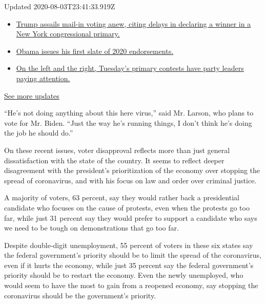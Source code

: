 Updated 2020-08-03T23:41:33.919Z

\begin{itemize}
\tightlist
\item
  \href{https://www.nytimes.com/2020/08/03/us/elections/biden-vs-trump.html?action=click\&pgtype=Article\&state=default\&region=MAIN_CONTENT_1\&context=storylines_live_updates\#link-6494b448}{Trump
  assails mail-in voting anew, citing delays in declaring a winner in a
  New York congressional primary.}
\item
  \href{https://www.nytimes.com/2020/08/03/us/elections/biden-vs-trump.html?action=click\&pgtype=Article\&state=default\&region=MAIN_CONTENT_1\&context=storylines_live_updates\#link-3de249e6}{Obama
  issues his first slate of 2020 endorsements.}
\item
  \href{https://www.nytimes.com/2020/08/03/us/elections/biden-vs-trump.html?action=click\&pgtype=Article\&state=default\&region=MAIN_CONTENT_1\&context=storylines_live_updates\#link-2340e8b5}{On
  the left and the right, Tuesday's primary contests have party leaders
  paying attention.}
\end{itemize}

\href{https://www.nytimes.com/2020/08/03/us/elections/biden-vs-trump.html?action=click\&pgtype=Article\&state=default\&region=MAIN_CONTENT_1\&context=storylines_live_updates}{See
more updates}

``He's not doing anything about this here virus,'' said Mr. Larson, who
plans to vote for Mr. Biden. ``Just the way he's running things, I don't
think he's doing the job he should do.''

On these recent issues, voter disapproval reflects more than just
general dissatisfaction with the state of the country. It seems to
reflect deeper disagreement with the president's prioritization of the
economy over stopping the spread of coronavirus, and with his focus on
law and order over criminal justice.

A majority of voters, 63 percent, say they would rather back a
presidential candidate who focuses on the cause of protests, even when
the protests go too far, while just 31 percent say they would prefer to
support a candidate who says we need to be tough on demonstrations that
go too far.

Despite double-digit unemployment, 55 percent of voters in these six
states say the federal government's priority should be to limit the
spread of the coronavirus, even if it hurts the economy, while just 35
percent say the federal government's priority should be to restart the
economy. Even the newly unemployed, who would seem to have the most to
gain from a reopened economy, say stopping the coronavirus should be the
government's priority.

